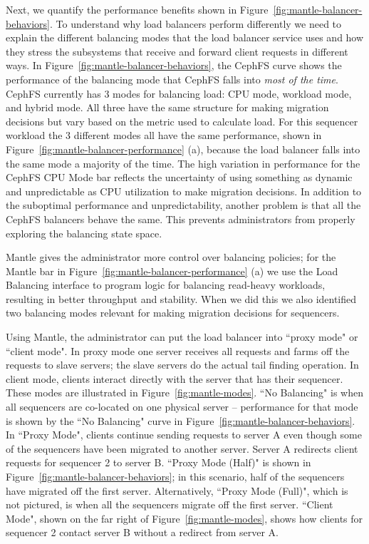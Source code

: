 Next, we quantify the performance benefits shown in
Figure~\ref{fig:mantle-balancer-behaviors}.  To understand why load balancers
perform differently we need to explain the different balancing modes that the
load balancer service uses and how they stress the subsystems that receive and
forward client requests in different ways. In
Figure~\ref{fig:mantle-balancer-behaviors}, the CephFS curve shows the
performance of the balancing mode that CephFS falls into {\it most of the
time}.  CephFS currently has 3 modes for balancing load: CPU mode, workload
mode, and hybrid mode. All three have the same structure for making migration
decisions but vary based on the metric used to calculate load. For this
sequencer workload the 3 different modes all have the same performance, shown
in Figure~\ref{fig:mantle-balancer-performance} (a), because the load balancer
falls into the same mode a majority of the time.  The high variation in
performance for the CephFS CPU Mode bar reflects the uncertainty of using
something as dynamic and unpredictable as CPU utilization to make migration
decisions.  In addition to the suboptimal performance and unpredictability,
another problem is that all the CephFS balancers behave the same. This prevents
administrators from properly exploring the balancing state space.

Mantle gives the administrator more control over balancing policies; for the
Mantle bar in Figure~\ref{fig:mantle-balancer-performance} (a) we use the Load
Balancing interface to program logic for balancing read-heavy workloads,
resulting in better throughput and stability.  When we did this we also
identified two balancing modes relevant for making migration decisions for
sequencers. 

Using Mantle, the administrator can put the load balancer into ``proxy mode" or
``client mode". In proxy mode one server receives all requests and farms off
the requests to slave servers; the slave servers do the actual tail finding
operation. In client mode, clients interact directly with the server that has
their sequencer.  These modes are illustrated in Figure~\ref{fig:mantle-modes}.
``No Balancing" is when all sequencers are co-located on one physical server --
performance for that mode is shown by the ``No Balancing" curve in
Figure~\ref{fig:mantle-balancer-behaviors}. In ``Proxy Mode", clients continue
sending requests to server A even though some of the sequencers have been
migrated to another server. Server A redirects client requests for sequencer 2
to server B.  ``Proxy Mode (Half)" is shown in
Figure~\ref{fig:mantle-balancer-behaviors}; in this scenario, half of the
sequencers have migrated off the first server. Alternatively, ``Proxy Mode
(Full)", which is not pictured, is when all the sequencers migrate off the
first server.  ``Client Mode", shown on the far right of
Figure~\ref{fig:mantle-modes}, shows how clients for sequencer 2 contact server
B without a redirect from server A.

